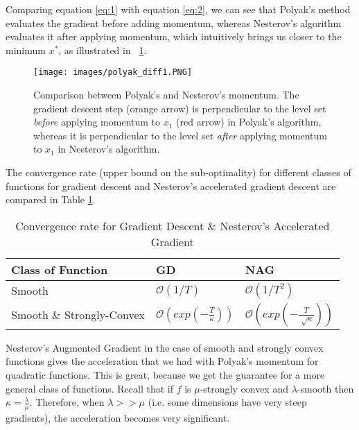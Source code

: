 \documentclass{article}
\begin{document}
Comparing equation \eqref{eq:1} with equation \eqref{eq:2}, we can see that Polyak's method evaluates the gradient before adding momentum, whereas Nesterov's algorithm evaluates it after applying momentum, which intuitively brings us closer to the minimum $x^*$, as illustrated in \figurename \ \ref{fig:momentum_comparison}.

\begin{figure}[H]
  \centering
  \texttt{[image: images/polyak\_diff1.PNG]}
  \caption{Comparison between Polyak's and Nesterov's momentum. The gradient descent step (orange arrow) is perpendicular to the level set \emph{before} applying momentum to $x_1$ (red arrow) in Polyak's algorithm, whereas it is perpendicular to the level set \emph{after} applying momentum to $x_1$ in Nesterov's algorithm.}
  \label{fig:momentum_comparison}
\end{figure}

The convergence rate (upper bound on the sub-optimality) for different classes of functions for gradient descent and Nesterov's accelerated gradient descent are compared in Table \ref{labt1}.

\begin{table}[H]
  \caption{Convergence rate for Gradient Descent \& Nesterov's Accelerated Gradient}
  \label{sample-table}
  \centering
  \begin{tabular}{lll}
   \\
    Class of Function & GD & NAG  \\
    \midrule
    Smooth & $\mathcal O(1/T)$ & $ \mathcal O(1/T^2)$   \\
    Smooth \& Strongly-Convex & $ \mathcal O\left(exp \left(-\frac{T}{\kappa}\right)\right)$  & $ \mathcal O\left(exp \left(-\frac{T}{\sqrt[]{\kappa}}\right)\right)$\\
    \bottomrule
  \end{tabular}
  \label{labt1}
\end{table}

Nesterov's Augmented Gradient in the case of smooth and strongly convex functions gives the acceleration that we had with Polyak's momentum for quadratic functions. This is great, because we get the guarantee for a more general class of functions. Recall that if $f$ is $\mu$-strongly convex and $\lambda$-smooth then $\kappa = \frac{\lambda}{\mu}$. Therefore, when $\lambda >> \mu$ (i.e. some dimensions have very steep gradients), the acceleration becomes very significant.
\newline
\end{document}
